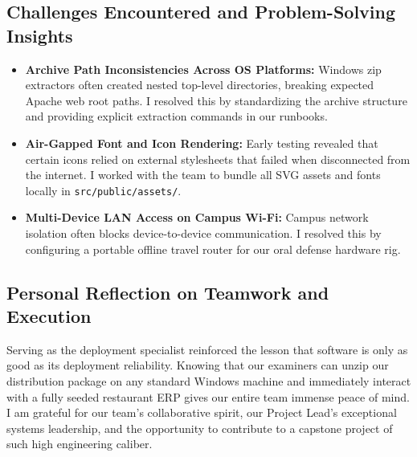 \subsection{Challenges Encountered and Problem-Solving Insights}
\begin{itemize}
    \item \textbf{Archive Path Inconsistencies Across OS Platforms:} Windows zip extractors often created nested top-level directories, breaking expected Apache web root paths. I resolved this by standardizing the archive structure and providing explicit extraction commands in our runbooks.
    \item \textbf{Air-Gapped Font and Icon Rendering:} Early testing revealed that certain icons relied on external stylesheets that failed when disconnected from the internet. I worked with the team to bundle all SVG assets and fonts locally in \texttt{src/public/assets/}.
    \item \textbf{Multi-Device LAN Access on Campus Wi-Fi:} Campus network isolation often blocks device-to-device communication. I resolved this by configuring a portable offline travel router for our oral defense hardware rig.
\end{itemize}

\subsection{Personal Reflection on Teamwork and Execution}
Serving as the deployment specialist reinforced the lesson that software is only as good as its deployment reliability. Knowing that our examiners can unzip our distribution package on any standard Windows machine and immediately interact with a fully seeded restaurant ERP gives our entire team immense peace of mind. I am grateful for our team's collaborative spirit, our Project Lead's exceptional systems leadership, and the opportunity to contribute to a capstone project of such high engineering caliber.
